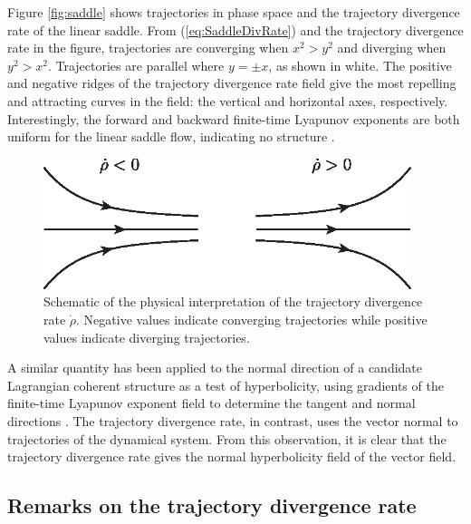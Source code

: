 \documentclass[twocolumn]{svjour3}
\begin{document}
Figure \ref{fig:saddle} shows trajectories in phase space and the trajectory divergence rate of the linear saddle. From (\ref{eq:SaddleDivRate}) and the trajectory divergence rate in the figure, trajectories are converging when $x^2>y^2$ and diverging when $y^2>x^2$. Trajectories are parallel where $y=\pm x$, as shown in white. The positive and negative ridges of the trajectory divergence rate field give the most repelling and attracting curves in the field: the vertical and horizontal axes, respectively. Interestingly, the forward and backward finite-time Lyapunov exponents are both uniform for the linear saddle flow, indicating no structure \cite{haller_variational_2011}.

\begin{figure}
\centering
\includegraphics[height=1.5in]{Figures/div-rate-schema.eps}
\caption{Schematic of the physical interpretation of the trajectory divergence rate $\dot{\rho}$. Negative values indicate converging trajectories while positive values indicate diverging trajectories.}
\label{fig:DivRateSchema}
\end{figure}

A similar quantity has been applied to the normal direction of a candidate Lagrangian coherent structure as a test of hyperbolicity, using gradients of the finite-time Lyapunov exponent field to determine the tangent and normal directions \cite{green2010using}. The trajectory divergence rate, in contrast, uses the vector normal to trajectories of the dynamical system. From this observation, it is clear that the trajectory divergence rate gives the normal hyperbolicity field of the vector field.

\subsection{Remarks on the trajectory divergence rate}
\end{document}
